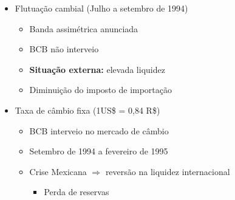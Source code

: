 \documentclass[11pt]{article}
\begin{document}
\begin{itemize}
\begin{itemize}
\item Flutuação cambial (Julho a setembro de 1994)
\begin{itemize}
\item Banda assimétrica anunciada
\item BCB não interveio
\item \textbf{Situação externa:} elevada liquidez
\item Diminuição do imposto de importação
\end{itemize}
\item Taxa de câmbio fixa (1US\$ = 0,84 R\$)
\begin{itemize}
\item BCB interveio no mercado de câmbio
\item Setembro de 1994 a fevereiro de 1995
\item Crise Mexicana \(\Rightarrow\) reversão na liquidez internacional
\begin{itemize}
\item Perda de reservas
\end{itemize}
\end{itemize}
\end{itemize}
\end{itemize}
\end{document}
